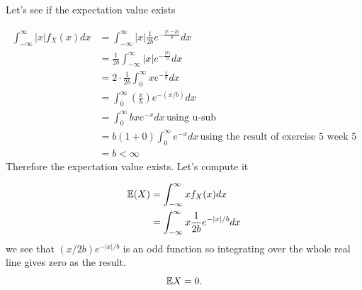 
Let's see if the expectation value exists

\begin{align*}
    \int_{-\infty}^{\infty} |x| f_{X} (x) dx &= \int_{-\infty}^{\infty} |x| \frac{1}{2b} e^{-
    \frac{|x- \mu|}{b} } dx\\
					     &= \frac{1}{2b} \int_{-\infty}^{\infty} |x| e^{-
					     \frac{|x|}{b} } dx\\
					     &= 2 \cdot \frac{1}{2b} \int_{0}^{\infty} x e^{-
					     \frac{x}{b} } dx\\
					     &= \int_{0}^{\infty} \left( \frac{x}{b}  \right)
					     e^{-(x/b)} dx\\
					     &= \int_{0}^{\infty} bx e^{-x}  dx \, \mbox{using u-sub}
					     \\
					     &= b(1+0) \int_{0}^{\infty} e^{-x} dx \, \mbox{using the
					     result of exercise 5 week 5} \\
					     &= b < \infty
\end{align*}
Therefore the expectation value exists. Let's compute it

\begin{align*}
    \mathbb{E} (X) &= \int_{-\infty}^{\infty} x f_{X} (x) dx\\
	   &= \int_{-\infty}^{\infty} x \frac{1}{2b} e^{-|x|/b} dx\\
\end{align*}
we see that $ (x/2b) e^{-|x|/b} $ is an odd function so integrating over the whole real line gives
zero as the result. 
\[
    \mathbb{E} X = 0
.\] 
